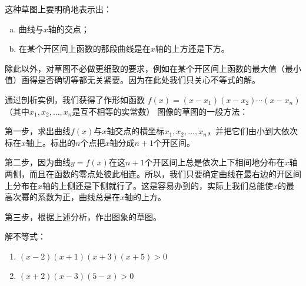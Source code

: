 这种草图上要明确地表示出：
\begin{enumerate}[(a)]
    \item 曲线与$x$轴的交点；
    \item 在某个开区间上函数的那段曲线是在$x$轴的上方还是下方。
\end{enumerate}
除此以外，对草图不必做更细致的要求，例如在某个开区间上函数的最大值（最小值）画得是否确切等都无关紧要。因为在此处我们只关心不等式的解。

通过剖析实例，我们获得了作形如函数
$f(x)=(x-x_1)(x-x_2)\cdots (x-x_n)$
（其中$x_1,x_2,\ldots,x_n$是互不相等的实常数）
图像的草图的一般方法：

第一步，求出曲线$f(x)$与$x$轴交点的横坐标$x_1,x_2,\ldots,x_n$，并把它们由小到大依次标在$x$轴上。标出的$n$个点把$x$轴分成$n+1$个开区间。

第二步，因为曲线$y=f(x)$在这$n+1$个开区间上总是依次上下相间地分布在$x$轴两侧，而且在函数的零点处彼此相连。所以，我们只要确定曲线在最右边的开区间上分布在$x$轴的上侧还是下侧就行了。这是容易办到的，实际上我们总能使$x$的最高次幂的系数为正，曲线总是在$x$轴的上方。

第三步，根据上述分析，作出图象的草图。

\begin{example}
    解不等式：
    \begin{multicols}{2}
\begin{enumerate}[(1)]
    \item $(x-2)(x+1)(x+3)(x+5)>0$
    \item $(x+2)(x-3)(5-x)>0$
\end{enumerate}        
    \end{multicols}
\end{example}

